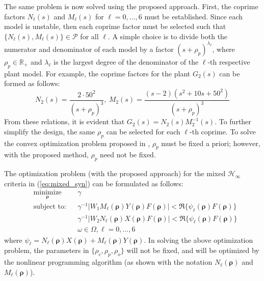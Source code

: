 \documentclass[letterpaper, 10 pt, conference]{ieeeconf}  %
\begin{document}
The same problem is now solved using the proposed approach. First, the coprime factors $N_{\ell}(s)$ and $M_{\ell}(s)$ for ${\ell} = 0,\ldots,6$ must be established. Since each model is unstable, then each coprime factor must be selected such that $\{N_{\ell}(s),M_{\ell}(s) \}  \in \mathscr{P}$ for all ${\ell}$. A simple choice is to divide both the numerator and denominator of each model by a factor $(s+\rho_p)^{\lambda_{\ell}}$, where $\rho_p \in \mathbb{R}_+$ and ${\lambda_{\ell}}$ is the largest degree of the denominator of the $\ell$-th respective plant model. For example, the coprime factors for the plant $G_2(s)$ can be formed as follows:
\begin{equation}
N_2(s) = \frac{2 \cdot 50^2 }{(s+\rho_p)^3}, \ M_2(s) = \frac{(s-2)(s^2+10s+50^2) }{(s+\rho_p)^3}
\end{equation}
From these relations, it is evident that $G_2(s) = N_2(s)M_2^{-1}(s)$. To further simplify the design, the same $\rho_p$ can be selected for each $\ell$-th coprime. To solve the convex optimization problem proposed in \cite{KNZ16}, $\rho_p$ must be fixed a priori; however, with the proposed method, $\rho_p$ need not be fixed. 

The optimization problem (with the proposed approach) for the mixed $\mathcal{H}_\infty$ criteria in (\ref{eq:mixed_syn}) can be formulated as follows:
\begin{equation} \label{eq:opt_true_ex3}
\begin{aligned}
& \underset{ \bm{\rho}}{\text{minimize}}
& & \gamma  \\
& \text{subject to:} & & \gamma^{-1} |W_1M_{\ell}(\bm{\rho})Y(\bm{\rho})F(\bm{\rho})| < \Re\{\psi_{\ell}(\bm{\rho}) F(\bm{\rho})\} \\ 
& & &  \gamma^{-1} |W_2N_{\ell}(\bm{\rho})X(\bm{\rho})F(\bm{\rho})| < \Re\{\psi_{\ell}(\bm{\rho}) F(\bm{\rho})\}   \\ 
& & & \omega \in \Omega, \ell = 0,\ldots,6
\end{aligned}
\end{equation}
where $\psi_{\ell} = N_{\ell}(\bm{\rho})X(\bm{\rho}) + M_{\ell}(\bm{\rho})Y(\bm{\rho})$. In solving the above optimization problem, the parameters in $\{\rho_c,\rho_p,\rho_o \}$ will not be fixed, and will be optimized by the nonlinear programming algorithm (as shown with the notation $N_{\ell}(\bm{\rho})$ and $M_{\ell}(\bm{\rho})$). 
\end{document}
